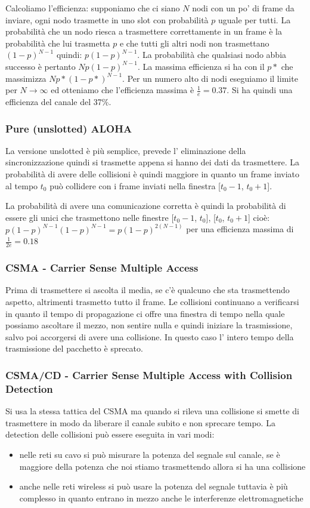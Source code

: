 Calcoliamo l'efficienza: supponiamo che ci siano $N$ nodi con un po' di frame da inviare, ogni nodo trasmette in uno slot con probabilità $p$ uguale per tutti.
La probabilità che un nodo riesca a trasmettere correttamente in un frame è la probabilità che lui trasmetta $p$ e che tutti gli altri nodi non trasmettano $(1-p)^{N-1}$ quindi: $p(1-p)^{N-1}$.
La probabilità che qualsiasi nodo abbia successo è pertanto $Np(1-p)^{N-1}$.
La massima efficienza si ha con il $p*$ che massimizza $Np*(1-p*)^{N-1}$.
Per un numero alto di nodi eseguiamo il limite per $N \xrightarrow{} \infty$ ed otteniamo che l'efficienza massima è $\frac{1}{e} = 0.37$.
Si ha quindi una efficienza del canale del 37\%.

\subsubsection{Pure (unslotted) ALOHA}
La versione unslotted è più semplice, prevede l' eliminazione della sincronizzazione quindi si trasmette appena si hanno dei dati da trasmettere.
La probabilità di avere delle collisioni è quindi maggiore in quanto un frame inviato al tempo $t_0$ può collidere con i frame inviati nella finestra [$t_0-1$, $t_0+1$].

La probabilità di avere una comunicazione corretta è quindi la probabilità di essere gli unici che trasmettono nelle finestre [$t_0-1$, $t_0$], [$t_0$, $t_0+1$] cioè: $p(1-p)^{N-1}(1-p)^{N-1} = p(1-p)^{2(N-1)}$ per una efficienza massima di $\frac{1}{2e} = 0.18$

\subsubsection{CSMA - Carrier Sense Multiple Access}
Prima di trasmettere si ascolta il media, se c'è qualcuno che sta trasmettendo aspetto, altrimenti trasmetto tutto il frame.
Le collisioni continuano a verificarsi in quanto il tempo di propagazione ci offre una finestra di tempo nella quale possiamo ascoltare il mezzo, non sentire nulla e quindi iniziare la trasmissione, salvo poi accorgersi di avere una collisione.
In questo caso l' intero tempo della trasmissione del pacchetto è sprecato.

\subsubsection{CSMA/CD - Carrier Sense Multiple Access with Collision Detection}
Si usa la stessa tattica del CSMA ma quando si rileva una collisione si smette di trasmettere in modo da liberare il canale subito e non sprecare tempo.
La detection delle collisioni può essere eseguita in vari modi:
\begin{itemize}
    \item nelle reti su cavo si può misurare la potenza del segnale sul canale, se è maggiore della potenza che noi stiamo trasmettendo allora si ha una collisione
    
    \item anche nelle reti wireless si può usare la potenza del segnale tuttavia è più complesso in quanto entrano in mezzo anche le interferenze elettromagnetiche
\end{itemize}

